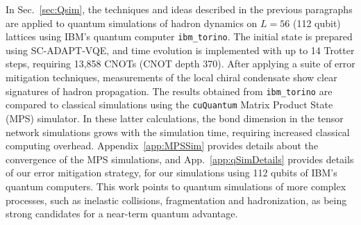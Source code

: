 \documentclass[aps, prc, tightenlines,superscriptaddress, letterpaper, amsmath, amssymb, preprintnumbers, floatfix, longbibliography, nofootinbib]{revtex4-2}
\begin{document}
In Sec.~\ref{sec:Qsim}, the techniques and ideas described in the previous paragraphs
are applied to quantum simulations of hadron dynamics on $L=56$ (112 qubit) lattices using IBM's quantum computer {\tt ibm\_torino}.
The initial state is prepared using SC-ADAPT-VQE, and time evolution is implemented with up to 14 Trotter steps, requiring 13,858 CNOTs (CNOT depth 370).
After applying a suite of error mitigation techniques, measurements of the local chiral condensate show clear signatures of hadron propagation.
The results obtained from {\tt ibm\_torino} are compared to classical simulations using the {\tt cuQuantum} Matrix Product State (MPS) simulator.
In these latter calculations, the bond dimension in the tensor network simulations grows with the simulation time, requiring increased classical computing overhead. 
Appendix~\ref{app:MPSSim} provides details about
the convergence of the MPS simulations, 
and App.~\ref{app:qSimDetails} provides details of
our error mitigation strategy, for our simulations using 112 qubits of IBM's quantum computers.
This work points to quantum simulations of more complex processes, such as inelastic collisions, fragmentation and hadronization, as being strong candidates for a near-term quantum advantage.




\end{document}
